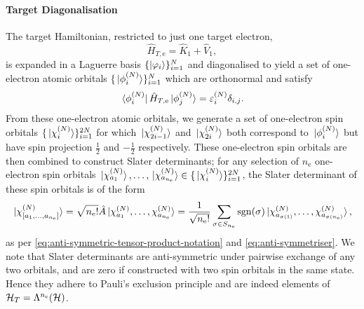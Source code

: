 \documentclass[draft]{article}
\begin{document}
\paragraph{Target Diagonalisation}
\label{sec:target-diagonalisation}

The target Hamiltonian, restricted to just one target electron,
\begin{equation}
  \label{eq:target-1e-hamiltonian}
  \hat{H}_{T, \mathrm{e}}^{}
  =
  \hat{K}_{1}
  +
  \hat{V}_{1}
  ,
\end{equation}
is expanded in a Laguerre basis $\lbrace\ket{\varphi_{i}}\rbrace_{i = 1}^{N}$ and
diagonalised to yield a set of one-electron atomic orbitals
$\lbrace\ket*{\phi_{i}^{(N)}}\rbrace_{i = 1}^{N}$ which are orthonormal and
satisfy
\begin{equation}
  \label{eq:target-1e-orbitals}
  \bra*{\phi_{i}^{(N)}}
  \hat{H}_{T, \mathrm{e}}
  \ket*{\phi_{j}^{(N)}}
  =
  \varepsilon_{i}^{(N)}
  \delta_{i, j}
  .
\end{equation}
From these one-electron atomic orbitals, we generate a set of one-electron spin
orbitals $\lbrace\ket*{\chi_{i}^{(N)}}\rbrace_{i = 1}^{2N}$ for which
$\ket*{\chi_{2i - 1}^{(N)}}$ and $\ket*{\chi_{2i}^{(N)}}$ both correspond
to $\ket*{\phi_{i}^{(N)}}$ but have spin projection $\tfrac{1}{2}$ and
$-\tfrac{1}{2}$ respectively.
These one-electron spin orbitals are then combined to construct Slater
determinants; for any selection of $n_{\mathrm{e}}$ one-electron spin orbitals
$\ket*{\chi_{a_{1}}^{(N)}}, \dotsc, \ket*{\chi_{a_{n_{\mathrm{e}}}}^{(N)}}
\in \lbrace\ket*{\chi_{i}^{(N)}}\rbrace_{i = 1}^{2N}$, the Slater determinant of
these spin orbitals is of the form
\begin{equation}
  \label{eq:target-slater-determinant}
  \ket*{\chi_{[a_{1}, \dotsc, a_{n_{\mathrm{e}}}]}^{(N)}}
  =
  \sqrt{n_{\mathrm{e}}!}
  \hat{A}
  \ket*
  {
    \chi_{a_{1}}^{(N)},
    \dotsc,
    \chi_{a_{n_{\mathrm{e}}}}^{(N)}
  }
  =
  \dfrac{1}{\sqrt{n_{\mathrm{e}}!}}
  \sum_{\sigma \in S_{n_{\mathrm{e}}}}
  \mathrm{sgn}(\sigma)
  \ket*
  {
    \chi_{a_{\sigma(1)}}^{(N)}
    ,
    \dots
    ,
    \chi_{a_{\sigma(n_{\mathrm{e}})}}^{(N)}
  }
  ,
\end{equation}
as per \autoref{eq:anti-symmetric-tensor-product-notation} and
\autoref{eq:anti-symmetriser}.
We note that Slater determinants are anti-symmetric under pairwise exchange of
any two orbitals, and are zero if constructed with two spin orbitals in the same
state.
Hence they adhere to Pauli's exclusion principle and are indeed elements
of $\mathcal{H}_{T} = \Lambda^{n_{\mathrm{e}}}(\mathcal{H})$.
\end{document}
